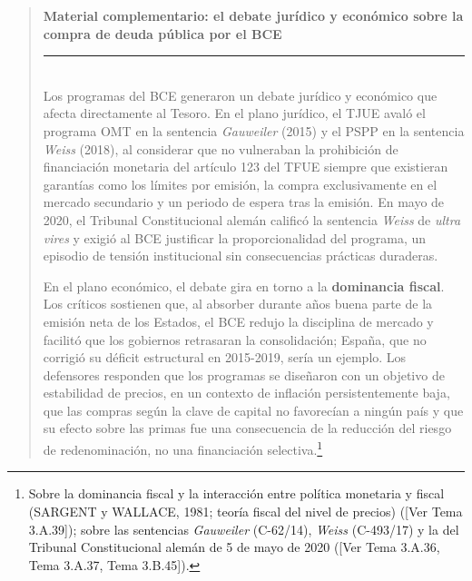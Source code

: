 \documentclass[10pt,a4paper]{article}
\newenvironment{specialblock}[1]{%
      \begin{quote} %
      \small %
      \noindent\textbf{#1}\\[-0.3em] %
      \rule{\linewidth}{0.4pt}\\[0.6em]}{
      \end{quote}}
\newcommand{\authorfont}[1]{{\fontfamily{EBGaramond-TLF}\selectfont #1}}
\begin{document}
\begin{specialblock}{\textbf{Material complementario:} el debate jurídico y económico sobre la compra de deuda pública por el BCE}
    Los programas del BCE generaron un debate jurídico y económico que afecta directamente al Tesoro. En el plano jurídico, el TJUE avaló el programa OMT en la sentencia \textit{Gauweiler} (2015) y el PSPP en la sentencia \textit{Weiss} (2018), al considerar que no vulneraban la prohibición de financiación monetaria del artículo 123 del TFUE siempre que existieran garantías como los límites por emisión, la compra exclusivamente en el mercado secundario y un periodo de espera tras la emisión. En mayo de 2020, el Tribunal Constitucional alemán calificó la sentencia \textit{Weiss} de \textit{ultra vires} y exigió al BCE justificar la proporcionalidad del programa, un episodio de tensión institucional sin consecuencias prácticas duraderas.

    En el plano económico, el debate gira en torno a la \textbf{dominancia fiscal}. Los críticos sostienen que, al absorber durante años buena parte de la emisión neta de los Estados, el BCE redujo la disciplina de mercado y facilitó que los gobiernos retrasaran la consolidación; España, que no corrigió su déficit estructural en 2015-2019, sería un ejemplo. Los defensores responden que los programas se diseñaron con un objetivo de estabilidad de precios, en un contexto de inflación persistentemente baja, que las compras según la clave de capital no favorecían a ningún país y que su efecto sobre las primas fue una consecuencia de la reducción del riesgo de redenominación, no una financiación selectiva.\footnote{Sobre la dominancia fiscal y la interacción entre política monetaria y fiscal (SARGENT y WALLACE, 1981; teoría fiscal del nivel de precios) ([\authorfont{Ver Tema 3.A.39}]); sobre las sentencias \textit{Gauweiler} (C-62/14), \textit{Weiss} (C-493/17) y la del Tribunal Constitucional alemán de 5 de mayo de 2020 ([\authorfont{Ver Tema 3.A.36, Tema 3.A.37, Tema 3.B.45}]).
}
\end{specialblock}
\end{document}
